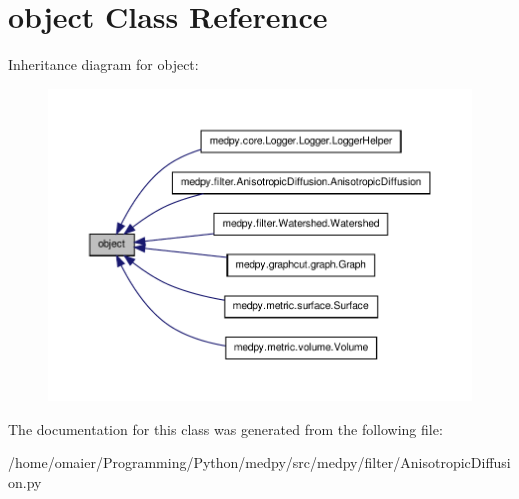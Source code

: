 \hypertarget{classobject}{
\section{object Class Reference}
\label{classobject}
}


Inheritance diagram for object:\nopagebreak
\begin{figure}[H]
\begin{center}
\leavevmode
\includegraphics[width=400pt]{classobject__inherit__graph}
\end{center}
\end{figure}


The documentation for this class was generated from the following file:\begin{DoxyCompactItemize}
\item 
/home/omaier/Programming/Python/medpy/src/medpy/filter/AnisotropicDiffusion.py\end{DoxyCompactItemize}
